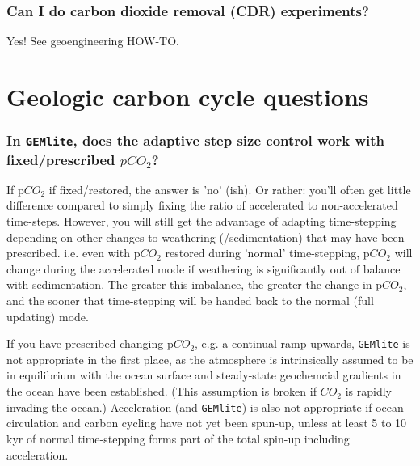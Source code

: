\documentclass[11pt,fleqn]{book} %
\begin{document}
%
\subsubsection{Can I do carbon dioxide removal (CDR) experiments?}

Yes! See geoengineering HOW-TO.


\newpage


\section{Geologic carbon cycle questions}

%
\subsubsection{In \texttt{GEMlite}, does the adaptive step size control work with fixed/prescribed \(pCO_{2}\)?}

If p\(CO_{2}\) if fixed/restored, the answer is 'no' (ish). Or rather: you'll often get little difference compared to simply fixing the ratio of accelerated to
non-accelerated time-steps.
However, you will still get the advantage of adapting time-stepping depending on other changes to weathering (/sedimentation) that may have been prescribed. i.e. even with p\(CO_{2}\) restored during 'normal' time-stepping, p\(CO_{2}\) will change during the accelerated mode if weathering is significantly out of balance with sedimentation. The greater this imbalance, the greater the change in p\(CO_{2}\), and the sooner that time-stepping will be handed back to the normal (full updating) mode.

If you have prescribed changing p\(CO_{2}\), e.g. a continual ramp upwards, \texttt{GEMlite} is not appropriate in the first place, as the atmosphere is intrinsically assumed to be in equilibrium with the ocean surface and steady-state geochemcial gradients in the ocean have been established. (This assumption is broken if \(CO_{2}\) is rapidly invading the ocean.)
Acceleration (and \texttt{GEMlite}) is also not appropriate if  ocean circulation and carbon cycling have not yet been spun-up, unless at least 5 to 10 kyr of normal time-stepping forms part of the total spin-up including acceleration.
%
\end{document}
